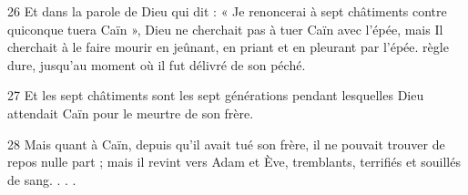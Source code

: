\par 26 Et dans la parole de Dieu qui dit : « Je renoncerai à sept châtiments contre quiconque tuera Caïn », Dieu ne cherchait pas à tuer Caïn avec l'épée, mais Il cherchait à le faire mourir en jeûnant, en priant et en pleurant par l'épée. règle dure, jusqu'au moment où il fut délivré de son péché.

\par 27 Et les sept châtiments sont les sept générations pendant lesquelles Dieu attendait Caïn pour le meurtre de son frère.

\par 28 Mais quant à Caïn, depuis qu'il avait tué son frère, il ne pouvait trouver de repos nulle part ; mais il revint vers Adam et Ève, tremblants, terrifiés et souillés de sang. . . .


